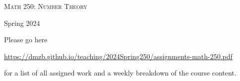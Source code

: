 \documentclass[12pt]{article}
\begin{document}
\begin{center}
{\Large \textsc{Math 250: Number Theory}}
\end{center}
\begin{center}
Spring 2024
\end{center}



\noindent Please go here 
\begin{center}
 \url{https://dmzb.github.io/teaching/2024Spring250/assignments-math-250.pdf}
\end{center}
for a list of all assigned work and a weekly breakdown of the course content.
\end{document}
